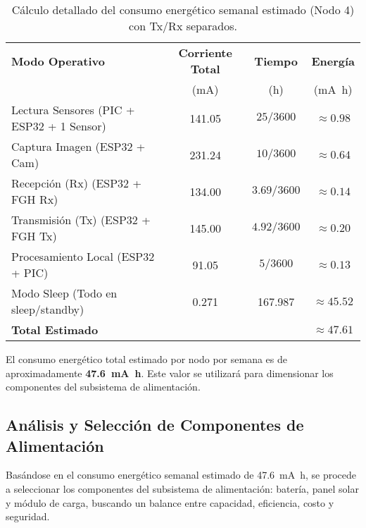\begin{table}[H] 
\centering
\caption{Cálculo detallado del consumo energético semanal estimado (Nodo 4) con Tx/Rx separados.}
\label{tab:consumo_detallado_semanal}
\renewcommand{\arraystretch}{1.3}
\begin{tabular}{l S[table-format=3.3] S[table-format=6.3] S[table-format=3.2]}
\toprule
\textbf{Modo Operativo} & {\textbf{Corriente Total}} & {\textbf{Tiempo}} & {\textbf{Energía}} \\
 & {(\unit{\milli\ampere})} & {(\unit{\hour})} & {(\unit{\milli\ampere\hour})} \\
\midrule
Lectura Sensores (PIC + ESP32 + 1 Sensor) & 141.05 & {$25/3600$} & {$\approx \num{0.98}$} \\
Captura Imagen (ESP32 + Cam) & 231.24 & {$10/3600$} & {$\approx \num{0.64}$} \\
Recepción (Rx) (ESP32 + FGH Rx) & 134.00 & {$3.69/3600$} & {$\approx \num{0.14}$} \\ %
Transmisión (Tx) (ESP32 + FGH Tx) & 145.00 & {$4.92/3600$} & {$\approx \num{0.20}$} \\ %
Procesamiento Local (ESP32 + PIC) & 91.05 & {$5/3600$} & {$\approx \num{0.13}$} \\
Modo Sleep (Todo en sleep/standby) & 0.271 & 167.987 & {$\approx \num{45.52}$} \\
\midrule
\textbf{Total Estimado} & & & {$\approx \num{47.61}$} \\ %
\bottomrule
\end{tabular}
\end{table}

El consumo energético total estimado por nodo por semana es de aproximadamente \textbf{\SI{47.6}{\milli\ampere\hour}}. Este valor se utilizará para dimensionar los componentes del subsistema de alimentación.

\subsection{Análisis y Selección de Componentes de Alimentación}
\label{subsec:seleccion_hardware_alimentacion}

Basándose en el consumo energético semanal estimado de \SI{47.6}{\milli\ampere\hour}, se procede a seleccionar los componentes del subsistema de alimentación: batería, panel solar y módulo de carga, buscando un balance entre capacidad, eficiencia, costo y seguridad.


